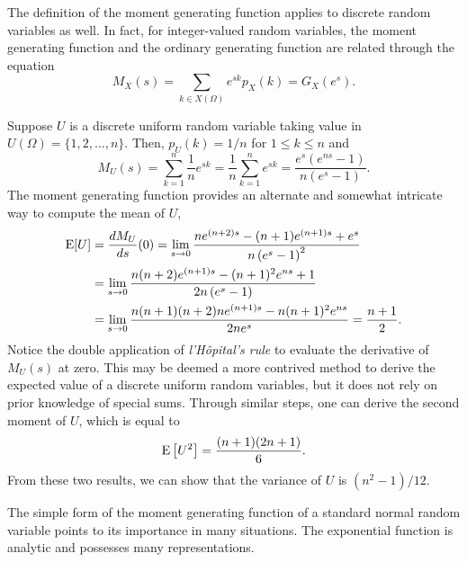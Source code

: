 The definition of the moment generating function applies to discrete random variables as well.
In fact, for integer-valued random variables, the moment generating function and the ordinary generating function are related through the equation  
\begin{equation*}
M_X (s) = \sum_{k \in X(\Omega)} e^{sk} p_X(k) = G_X (e^s) .
\end{equation*}

\begin{example}
Suppose $U$ is a discrete uniform random variable taking value in $U(\Omega) = \{ 1, 2, \ldots, n \}$.
Then, $p_U(k) = 1/n$ for $1 \leq k \leq n$ and
\begin{equation*}
M_U(s) = \sum_{k = 1}^n \frac{1}{n} e^{sk}
= \frac{1}{n} \sum_{k = 1}^n e^{sk}
= \frac {e^s (e^{ns} - 1)} {n (e^s - 1)} .
\end{equation*}
The moment generating function provides an alternate and somewhat intricate way to compute the mean of $U$,
\begin{equation*}
\begin{split}
\mathrm{E} [U] &= \frac{d M_U}{ds} (0)
= \lim_{s \rightarrow 0}
\frac{n e^{(n+2)s} - (n+1) e^{(n+1)s} + e^s}{n \left( e^s - 1 \right)^2} \\
&= \lim_{s \rightarrow 0}
\frac{n(n+2) e^{(n+1)s} - (n+1)^2 e^{ns} + 1}{2n \left( e^s - 1 \right)} \\
&= \lim_{s \rightarrow 0}
\frac{n(n+1)(n+2)n e^{(n+1)s} - n (n+1)^2 e^{ns}}{2n e^s}
= \frac {n + 1}{2} .
\end{split}
\end{equation*}
Notice the double application of \emph{l'H\^{o}pital's rule} to evaluate the derivative of $M_U(s)$ at zero.
This may be deemed a more contrived method to derive the expected value of a discrete uniform random variables, but it does not rely on prior knowledge of special sums.
Through similar steps, one can derive the second moment of $U$, which is equal to
\begin{equation*}
\mathrm{E} \left[ U^2 \right] = \frac{(n+1)(2n+1)}{6} .
\end{equation*}
From these two results, we can show that the variance of $U$ is $(n^2 - 1)/12$.
\end{example}

The simple form of the moment generating function of a standard normal random variable points to its importance in many situations.
The exponential function is analytic and possesses many representations.

